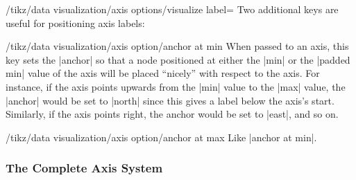 \begin{key}{/tikz/data visualization/axis options/visualize label=}
    Two additional keys are useful for positioning axis labels:
    \begin{key}{/tikz/data visualization/axis option/anchor at min}
        When passed to an axis, this key sets the |anchor| so that a node
        positioned at either the |min| or the |padded min| value of the axis
        will be placed ``nicely'' with respect to the axis. For instance, if
        the axis points upwards from the |min| value to the |max| value, the
        |anchor| would be set to |north| since this gives a label below the
        axis's start. Similarly, if the axis points right, the anchor would be
        set to |east|, and so on.
    \end{key}
    \begin{key}{/tikz/data visualization/axis option/anchor at max}
        Like |anchor at min|.
    \end{key}
\end{key}


\subsubsection{The Complete Axis System}

